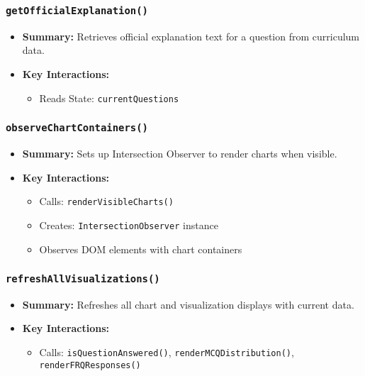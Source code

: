 \documentclass[11pt,letterpaper]{article}
\begin{document}
\subsubsection{\texttt{getOfficialExplanation()}}
\begin{itemize}
    \item \textbf{Summary:} Retrieves official explanation text for a question from curriculum data.
    \item \textbf{Key Interactions:}
    \begin{itemize}
        \item Reads State: \texttt{currentQuestions}
    \end{itemize}
\end{itemize}

\subsubsection{\texttt{observeChartContainers()}}
\begin{itemize}
    \item \textbf{Summary:} Sets up Intersection Observer to render charts when visible.
    \item \textbf{Key Interactions:}
    \begin{itemize}
        \item Calls: \texttt{renderVisibleCharts()}
        \item Creates: \texttt{IntersectionObserver} instance
        \item Observes DOM elements with chart containers
    \end{itemize}
\end{itemize}

\subsubsection{\texttt{refreshAllVisualizations()}}
\begin{itemize}
    \item \textbf{Summary:} Refreshes all chart and visualization displays with current data.
    \item \textbf{Key Interactions:}
    \begin{itemize}
        \item Calls: \texttt{isQuestionAnswered()}, \texttt{renderMCQDistribution()}, \texttt{renderFRQResponses()}
    \end{itemize}
\end{itemize}
\end{document}
